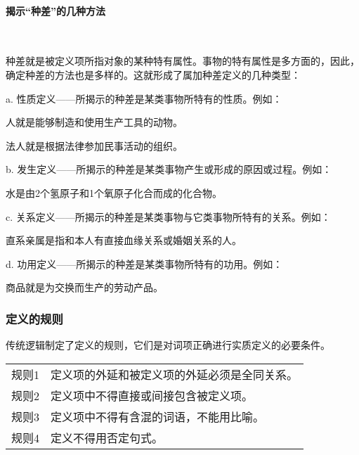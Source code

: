 \documentclass[
    a4paper,
    twoside
    ]{article}
\begin{document}
        \paragraph{
            揭示``种差''的几种方法
        }~{}
        \newline
        {
            种差就是被定义项所指对象的某种特有属性。事物的特有属性是多方面的，因此，确定种差的方法也是多样的。这就形成了属加种差定义的几种类型：

            a. 性质定义——所揭示的种差是某类事物所特有的性质。例如：

            {\fangsong{} 
                人就是能够制造和使用生产工具的动物。

                法人就是根据法律参加民事活动的组织。
            }

            b. 发生定义——所揭示的种差是某类事物产生或形成的原因或过程。例如：

            {
                \fangsong{}
                水是由2个氢原子和1个氧原子化合而成的化合物。
            }

            c. 关系定义——所揭示的种差是某类事物与它类事物所特有的关系。例如：

            {
                \fangsong{}
                直系亲属是指和本人有直接血缘关系或婚姻关系的人。
            }

            d. 功用定义——所揭示的种差是某类事物所特有的功用。例如：
            
            {
                \fangsong{}
                商品就是为交换而生产的劳动产品。
            }
        }

        \subsubsection{
            定义的规则
        }
        
        {
            传统逻辑制定了定义的规则，它们是对词项正确进行实质定义的必要条件。

            \begin{tabular}
                {ll}
            {规则1} & {定义项的外延和被定义项的外延必须是全同关系。}\\
            {规则2} & {定义项中不得直接或间接包含被定义项。}\\
            {规则3} & {定义项中不得有含混的词语，不能用比喻。}\\
            {规则4} & {定义不得用否定句式。}

            \end{tabular}
        }
\end{document}
